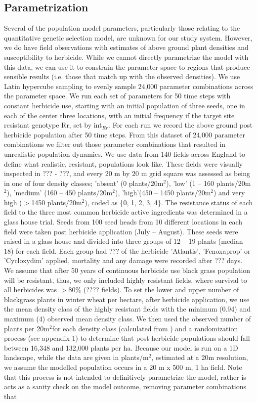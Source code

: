 \documentclass[10pt,letterpaper]{article}
\begin{document}
\subsection*{Parametrization}
Several of the population model parameters, particularly those relating to the quantitative genetic selection model, are unknown for our study system. However, we do have field observations with estimates of above ground plant densities and susceptibility to herbicide. While we cannot directly parametrize the model with this data, we can use it to constrain the parameter space to regions that produce sensible results (i.e. those that match up with the observed densities). We use Latin hypercube sampling to evenly sample 24,000 parameter combinations across the parameter space. We run each set of parameters for 50 time steps with constant herbicide use, starting with an initial population of three seeds, one in each of the center three locations, with an initial frequency if the target site resistant genotype Rr, set by int$_{Rr}$. For each run we record the above ground post herbicide population after 50 time steps. From this dataset of 24,000 parameter combinations we filter out those parameter combinations that resulted in unrealistic population dynamics. We use data from 140 fields across England to define what realistic, resistant, populations look like. These fields were visually inspected in ??? - ???, and every 20 m by 20 m grid square was assessed as being in one of four density classes; 'absent' (0 plants/20m$^2$), 'low' (1 -- 160 plants/20m$^2$), 'medium' (160 -- 450 plants/20m$^2$), 'high'(450 -- 1450 plants/20m$^2$) and very high ($>$1450 plants/20m$^2$), coded as \{0, 1, 2, 3, 4\}. The resistance status of each field to the three most common herbicide active ingredients was determined in a glass house trial. Seeds from 100 seed heads from 10 different locations in each field were taken post herbicide application (July -- August). These seeds were raised in a glass house and divided into three groups of 12 -- 19 plants (median 18) for each field. Each group had ??? of the herbicide 'Atlantis', 'Fenoxaprop' or 'Cycloxydim' applied, mortality and any damage were recorded after ??? days. We assume that after 50 years of continuous herbicide use black grass population will be resistant, thus, we only included highly resistant fields, where survival to all herbicides was $>80\%$ (???? fields). To set the lower and upper number of blackgrass plants in winter wheat per hectare, after herbicide application, we use the mean density class of the highly resistant fields with the minimum (0.94) and maximum (4) observed mean density class. We then used the observed number of plants per 20m$^2$for each density class (calculated from \cite{Quee2011}) and a randomization process (see appendix 1) to determine that post herbicide populations should fall between 16,348 and 132,000 plants per ha. Because our model is run on a 1D landscape, while the data are given in plants/m$^2$, estimated at a 20m resolution, we assume the modelled population occurs in a 20 m x 500 m, 1 ha field. Note that this process is not intended to definitively parametrize the model, rather is acts as a sanity check on the model outcome, removing parameter combinations that 
\end{document}
